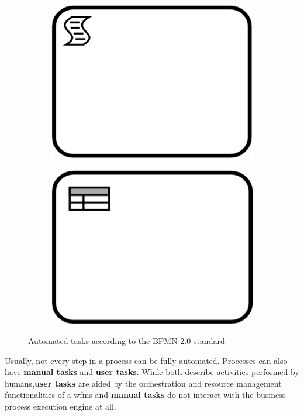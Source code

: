 \begin{figure}[H]
\begin{subfigure}[b]{0.18\columnwidth}
		\label{fig:receivetask}
	\end{subfigure}
	\begin{subfigure}[b]{0.18\columnwidth}
		\centering
		\includegraphics[width=0.9\columnwidth]{graphics/script-task}
		\label{fig:scripttask}
	\end{subfigure}
	\begin{subfigure}[b]{0.24\columnwidth}
		\includegraphics[width=0.675\columnwidth]{graphics/businessrule-task}
		\label{fig:businessruletask}
	\end{subfigure}
	\caption{Automated tasks according to the BPMN 2.0 standard \cite{bpmnstandard}} %
	\label{fig:automatedtasks} %
\end{figure}

Usually, not every step in a process can be fully automated. Processes can also have \textbf{manual tasks} and \textbf{user tasks}. While both describe activities performed by humans,\textbf{user tasks} are aided by the orchestration and resource management functionalities of a \gls{wfms} and \textbf{manual tasks} do not interact with the business process execution engine at all. 

